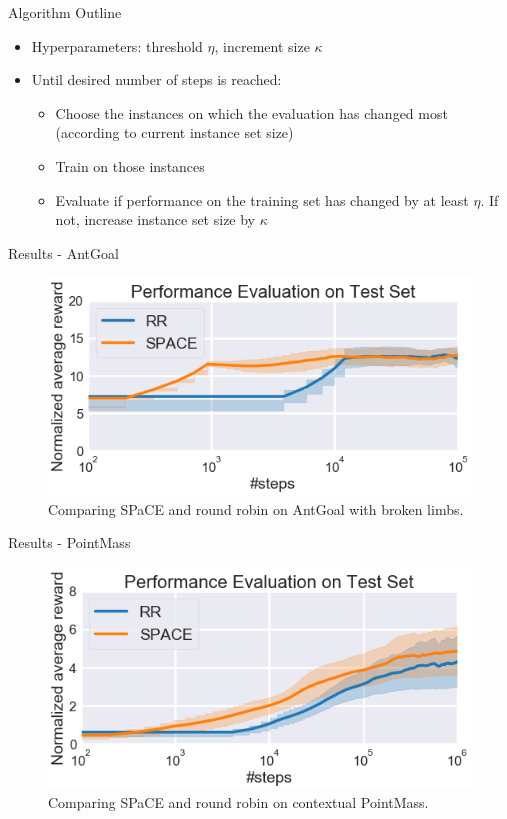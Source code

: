 \documentclass[aspectratio=169]{../latex_main/tntbeamer}  %
\begin{document}
\begin{frame}[c]{Algorithm Outline}
	
	\begin{itemize}
		\item Hyperparameters: threshold $\eta$, increment size $\kappa$
		\item Until desired number of steps is reached:
		\begin{itemize}
			\item Choose the instances on which the evaluation has changed most (according to current instance set size)
			\item Train on those instances
			\item Evaluate if performance on the training set has changed by at least $\eta$. If not, increase instance set size by $\kappa$
		\end{itemize}
	\end{itemize}
	
\end{frame}

\begin{frame}[c]{Results - AntGoal}
	
\begin{figure}
\centering
\includegraphics[scale=0.25]{images/antgoal}
\caption{Comparing SPaCE and round robin on AntGoal with broken limbs.}
\end{figure}
	
\end{frame}

\begin{frame}[c]{Results - PointMass}
	
\begin{figure}
\centering
\includegraphics[scale=0.25]{images/pointmass}
\caption{Comparing SPaCE and round robin on contextual PointMass.}
\end{figure}
	
\end{frame}
\end{document}
